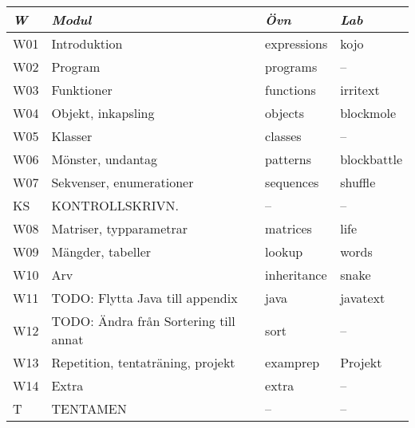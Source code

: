 \begin{tabular}{l|l|l|l}
\textit{W} & \textit{Modul} & \textit{Övn} & \textit{Lab} \\ \hline \hline
W01 & Introduktion & expressions & kojo \\
W02 & Program & programs & -- \\
W03 & Funktioner & functions & irritext \\
W04 & Objekt, inkapsling & objects & blockmole \\
W05 & Klasser & classes & -- \\
W06 & Mönster, undantag & patterns & blockbattle \\
W07 & Sekvenser, enumerationer & sequences & shuffle \\
KS & KONTROLLSKRIVN. & -- & -- \\
W08 & Matriser, typparametrar & matrices & life \\
W09 & Mängder, tabeller & lookup & words \\
W10 & Arv & inheritance & snake \\
W11 & TODO: Flytta Java till appendix & java & javatext \\
W12 & TODO: Ändra från Sortering till annat & sort & -- \\
W13 & Repetition, tentaträning, projekt & examprep & Projekt \\
W14 & Extra & extra & -- \\
T & TENTAMEN & -- & -- \\
\end{tabular}
